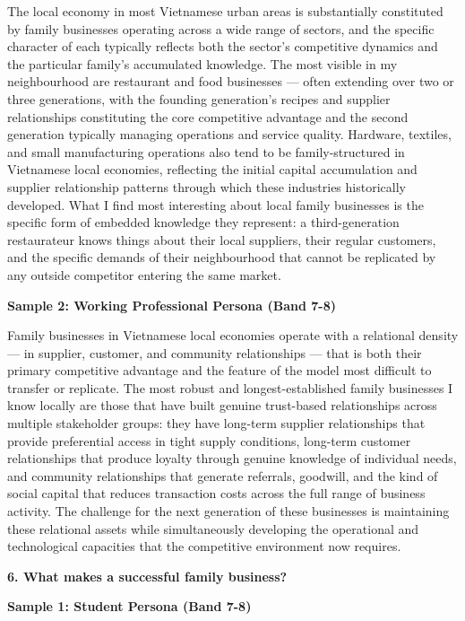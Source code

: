 The local economy in most Vietnamese urban areas is substantially constituted by family businesses operating across a wide range of sectors, and the specific character of each typically reflects both the sector's competitive dynamics and the particular family's accumulated knowledge. The most visible in my neighbourhood are restaurant and food businesses — often extending over two or three generations, with the founding generation's recipes and supplier relationships constituting the core competitive advantage and the second generation typically managing operations and service quality. Hardware, textiles, and small manufacturing operations also tend to be family-structured in Vietnamese local economies, reflecting the initial capital accumulation and supplier relationship patterns through which these industries historically developed. What I find most interesting about local family businesses is the specific form of embedded knowledge they represent: a third-generation restaurateur knows things about their local suppliers, their regular customers, and the specific demands of their neighbourhood that cannot be replicated by any outside competitor entering the same market.

\textbf{Sample 2: Working Professional Persona (Band 7-8)}

Family businesses in Vietnamese local economies operate with a relational density — in supplier, customer, and community relationships — that is both their primary competitive advantage and the feature of the model most difficult to transfer or replicate. The most robust and longest-established family businesses I know locally are those that have built genuine trust-based relationships across multiple stakeholder groups: they have long-term supplier relationships that provide preferential access in tight supply conditions, long-term customer relationships that produce loyalty through genuine knowledge of individual needs, and community relationships that generate referrals, goodwill, and the kind of social capital that reduces transaction costs across the full range of business activity. The challenge for the next generation of these businesses is maintaining these relational assets while simultaneously developing the operational and technological capacities that the competitive environment now requires.

\separator

\begin{ieltsquestion}
\textbf{6. What makes a successful family business?}
\end{ieltsquestion}
\textbf{Sample 1: Student Persona (Band 7-8)}

